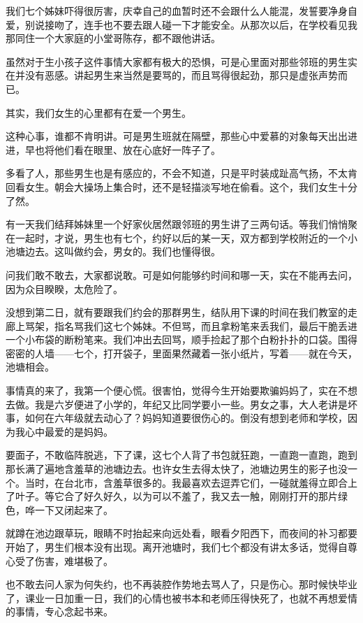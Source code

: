 \par 我们七个姊妹吓得很厉害，庆幸自己的血暂时还不会跟什么人能混，发誓要净身自爱，别说接吻了，连手也不要去跟人碰一下才能安全。从那次以后，在学校看见我那同住一个大家庭的小堂哥陈存，都不跟他讲话。
\par 虽然对于生小孩子这件事情大家都有极大的恐惧，可是心里面对那些邻班的男生实在并没有恶感。讲起男生来当然是要骂的，而且骂得很起劲，那只是虚张声势而已。
\par 其实，我们女生的心里都有在爱一个男生。
\par 这种心事，谁都不肯明讲。可是男生班就在隔壁，那些心中爱慕的对象每天出出进进，早也将他们看在眼里、放在心底好一阵子了。
\par 多看了人，那些男生也是有感应的，不会不知道，只是平时装成趾高气扬，不太肯回看女生。朝会大操场上集合时，还不是轻描淡写地在偷看。这个，我们女生十分了然。
\par 有一天我们结拜姊妹里一个好家伙居然跟邻班的男生讲了三两句话。等我们悄悄聚在一起时，才说，男生也有七个，约好以后的某一天，双方都到学校附近的一个小池塘边去。这叫做约会，男女的。我们也懂得很。
\par 问我们敢不敢去，大家都说敢。可是如何能够约时间和哪一天，实在不能再去问，因为众目睽睽，太危险了。
\par 没想到第二日，就有要跟我们约会的那群男生，结队用下课的时间在我们教室的走廊上骂架，指名骂我们这七个姊妹。不但骂，而且拿粉笔来丢我们，最后干脆丢进一个小布袋的断粉笔来。我们冲出去回骂，顺手捡起了那个白粉扑扑的口袋。围得密密的人墙——七个，打开袋子，里面果然藏着一张小纸片，写着——就在今天，池塘相会。
\par 事情真的来了，我第一个便心慌。很害怕，觉得今生开始要欺骗妈妈了，实在不想去做。我是六岁便进了小学的，年纪又比同学要小一些。男女之事，大人老讲是坏事，如何在六年级就去动心了？妈妈知道要很伤心的。倒没有想到老师和学校，因为我心中最爱的是妈妈。
\par 要面子，不敢临阵脱逃，下了课，这七个人背了书包就狂跑，一直跑一直跑，跑到那长满了遍地含羞草的池塘边去。也许女生去得太快了，池塘边男生的影子也没一个。当时，在台北市，含羞草很多的。我最喜欢去逗弄它们，一碰就羞得立即合上了叶子。等它合了好久好久，以为可以不羞了，我又去一触，刚刚打开的那片绿色，哗一下又闭起来了。
\par 就蹲在池边跟草玩，眼睛不时抬起来向远处看，眼看夕阳西下，而夜间的补习都要开始了，男生们根本没有出现。离开池塘时，我们七个都没有讲太多话，觉得自尊心受了伤害，难堪极了。
\par 也不敢去问人家为何失约，也不再装腔作势地去骂人了，只是伤心。那时候快毕业了，课业一日加重一日，我们的心情也被书本和老师压得快死了，也就不再想爱情的事情，专心念起书来。
